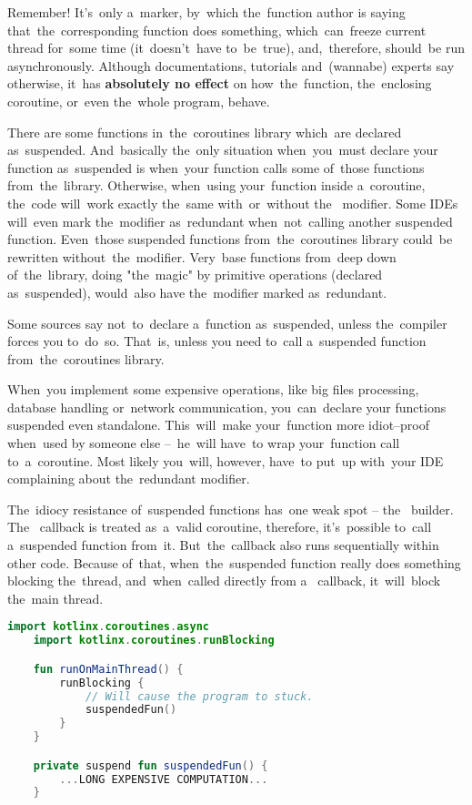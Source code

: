 \noindent Remember!
It's~only a~marker, by~which the~function author is saying that~the~corresponding function does something, which~can~freeze current thread for~some time (it~doesn't~have to~be~true), and,~therefore, should~be run asynchronously.
Although documentations, tutorials and~(wannabe) experts say otherwise, it~has \textbf{absolutely no effect} on how~the~function, the~enclosing coroutine, or~even the~whole program, \mbox{behave.}

There are some functions in~the~coroutines library which~are declared as~suspended.
And~basically the~only situation when~you~must declare your function as~suspended is when~your function calls some of~those functions from~the~library.
Otherwise, when~using your~function inside a~coroutine, the~code will~work exactly the~same with~or~without the~ modifier.
Some \mbox{IDEs} will~even mark the~modifier as~redundant when~not~calling another suspended function.
Even~those suspended functions from~the~coroutines library could~be rewritten without~the~modifier.
Very~base functions from~deep down of~the~library, doing \mbox{"the magic"} by primitive operations (declared as~suspended), would~also have the~modifier marked \mbox{as redundant}.

Some sources say not~to~declare a~function as~suspended, unless the~compiler forces you to~do~so.
That~is, unless you need to~call a~suspended function from~the~coroutines \mbox{library.}

When~you implement some expensive operations, like big files processing, database handling or~network communication, you~can~declare your functions suspended even standalone.
This~will~make your~function more idiot--proof when~used by someone else --~he~will have~to wrap your~function call to~a~coroutine.
Most likely you~will, however, have~to put~up with~your IDE complaining about the~redundant \mbox{modifier.}

\warning The~idiocy resistance of~suspended functions has~one weak spot -- the~ builder.
The~ callback is treated as~a~valid coroutine, therefore, it's~possible to~call a~suspended function from~it.
But~the~callback also runs sequentially within other code.
Because of~that, when~the~suspended function really does something blocking the~thread, and~when~called directly from a~ callback, it~will~block the~main \mbox{thread.}

\begin{lstlisting}[language=Kotlin]
    import kotlinx.coroutines.async
    import kotlinx.coroutines.runBlocking

    fun runOnMainThread() {
        runBlocking {
            // Will cause the program to stuck.
            suspendedFun()
        }
    }

    private suspend fun suspendedFun() {
        ...LONG EXPENSIVE COMPUTATION...
    }
\end{lstlisting}

